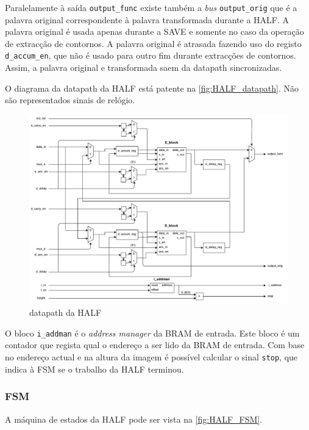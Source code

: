 \documentclass[a4paper]{article}
\begin{document}
Paralelamente à saída \texttt{output\_func} existe também a \textit{bus} \texttt{output\_orig} que é a palavra original correspondente à palavra transformada durante a HALF. A palavra original é usada apenas durante a SAVE e somente no caso da operação de extracção de contornos. A palavra original é atrasada fazendo uso do registo \texttt{d\_accum\_en}, que não é usado para outro fim durante extracções de contornos. Assim, a palavra original e transformada saem da datapath sincronizadas.

O diagrama da datapath da HALF está patente na \autoref{fig:HALF_datapath}. Não são representados sinais de relógio.

\begin{figure}[H]
	\centerline{
		\includegraphics[width=.95\paperwidth]{HALF_datapath}
	}
	\caption{datapath da HALF}
	\label{fig:HALF_datapath}
\end{figure}

O bloco \texttt{i\_addman} é o \textit{address manager} da BRAM de entrada. Este bloco é um contador que regista qual o endereço a ser lido da BRAM de entrada. Com base no endereço actual e na altura da imagem é possível calcular o sinal \texttt{stop}, que indica à FSM se o trabalho da HALF terminou.

\subsubsection{FSM}
A máquina de estados da HALF pode ser vista na \autoref{fig:HALF_FSM}.
\end{document}
